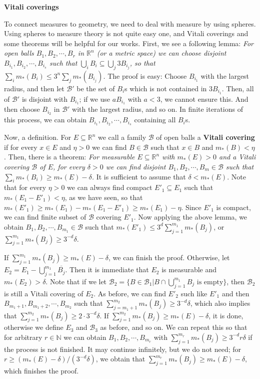 \documentclass{article}
\newcommand{\NaN}{\mathbb{N}}
\newcommand{\ReR}{\mathbb{R}}
\begin{document}
\newpage

\textbf{Vitali coverings}

To connect measures to geometry, we need to deal with measure by using spheres.
Using spheres to measure theory is not quite easy one, and Vitali coverings and some theorems will be helpful for our works.
First, we see a following lemma: \textit{For open balls $B_1, B_2, \cdots, B_r$ in $\ReR^n$ (or a metric space) we can choose disjoint $B_{i_1}, B_{i_2}, \cdots, B_{i_s}$ such that $\bigcup_i B_i \subseteq \bigcup_j 3B_{i_j}$, so that $\sum_i m_*(B_i) \le 3^n \sum_j m_*(B_{i_j})$.}
The proof is easy: Choose $B_{i_1}$ with the largest radius, and then let $\mathcal{B}'$ be the set of $B_i$s which is not contained in $3B_{i_1}$.
Then, all of $\mathcal{B}'$ is disjoint with $B_{i_1}$; if we use $aB_{i_1}$ with $a < 3$, we cannot ensure this.
And then choose $B_{i_2}$ in $\mathcal{B}'$ with the largest radius, and so on.
In finite iterations of this process, we can obtain $B_{i_1}, B_{i_2}, \cdots, B_{i_s}$ containing all $B_i$s.

Now, a definition.
For $E \subseteq \ReR^n$ we call a family $\mathcal{B}$ of open balls a \textbf{Vitali covering} if for every $x \in E$ and $\eta > 0$ we can find $B \in \mathcal{B}$ such that $x \in B$ and $m_*(B) < \eta$.
Then, there is a theorem: \textit{For measurable $E \subseteq \ReR^n$ with $m_*(E) > 0$ and a Vitali covering $\mathcal{B}$ of $E$, for every $\delta > 0$ we can find disjoint $B_1, B_2, \cdots, B_m \in \mathcal{B}$ such that $\sum_i m_*(B_i) \ge m_*(E) - \delta$.}
It is sufficient to assume that $\delta < m_*(E)$.
Note that for every $\eta > 0$ we can always find compact $E'_1 \subseteq E_1$ such that $m_*(E_1 - E'_1) < \eta$, as we have seen, so that $m_*(E'_1) \ge m_*(E_1) - m_*(E_1 - E'_1) \ge m_*(E_1) - \eta$.
Since $E'_1$ is compact, we can find finite subset of $\mathcal{B}$ covering $E'_1$.
Now applying the above lemma, we obtain $B_1, B_2, \cdots, B_{m_1} \in \mathcal{B}$ such that $m_*(E'_1) \le 3^d \sum_{j = 1}^{m_1} m_*(B_j)$, or $\sum_{j = 1}^{m_1} m_*(B_j) \ge 3^{-d} \delta$.

If $\sum_{j = 1}^{m_1} m_*(B_j) \ge m_*(E) - \delta$, we can finish the proof.
Otherwise, let $E_2 = E_1 - \bigcup_{j = 1}^{m_1} \overline{B_j}$.
Then it is immediate that $E_2$ is measurable and $m_*(E_2) > \delta$.
Note that if we let $\mathcal{B}_2 = \{ B \in \mathcal{B}_1 | B \cap \bigcup_{j = 1}^{m_1} B_j \textrm{ is empty} \}$, then $\mathcal{B}_2$ is still a Vitali covering of $E_2$.
As before, we can find $E'_2$ such like $E'_1$ and then $B_{m_1 + 1}, B_{m_1 + 2}, \cdots, B_{m_2}$ such that $\sum_{j = m_1 + 1}^{m_2} m_*(B_j) \ge 3^{-d} \delta$, which also implies that $\sum_{j = 1}^{m_2} m_*(B_j) \ge 2 \cdot 3^{-d} \delta$.
If $\sum_{j = 1}^{m_2} m_*(B_j) \ge m_*(E) - \delta$, it is done, otherwise we define $E_3$ and $\mathcal{B}_3$ as before, and so on.
We can repeat this so that for arbitrary $r \in \NaN$ we can obtain $B_1, B_2, \cdots, B_{m_r}$ with $\sum_{j = 1}^{m_r} m_*(B_j) \ge 3^{-d} r\delta$ if the process is not finished.
It may continue infinitely, but we do not need; for $r \ge (m_*(E) - \delta) / (3^{-d} \delta)$, we obtain that $\sum_{j = 1}^{m_r} m_*(B_j) \ge m_*(E) - \delta$, which finishes the proof.
\end{document}
